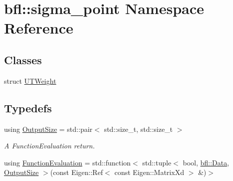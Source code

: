 \hypertarget{namespacebfl_1_1sigma__point}{}\section{bfl\+:\+:sigma\+\_\+point Namespace Reference}
\label{namespacebfl_1_1sigma__point}
\subsection*{Classes}
\begin{DoxyCompactItemize}
\item 
struct \mbox{\hyperlink{structbfl_1_1sigma__point_1_1UTWeight}{U\+T\+Weight}}
\end{DoxyCompactItemize}
\subsection*{Typedefs}
\begin{DoxyCompactItemize}
\item 
using \mbox{\hyperlink{namespacebfl_1_1sigma__point_aa482c1c98a2280cd8f7635ba81898b4e}{Output\+Size}} = std\+::pair$<$ std\+::size\+\_\+t, std\+::size\+\_\+t $>$
\begin{DoxyCompactList}\small\item\em A Function\+Evaluation return. \end{DoxyCompactList}\item 
using \mbox{\hyperlink{namespacebfl_1_1sigma__point_a6b412638c2556e4c1f84ba10965f785e}{Function\+Evaluation}} = std\+::function$<$ std\+::tuple$<$ bool, \mbox{\hyperlink{namespacebfl_af6b103c6821db1b54452f776fdd9dd02}{bfl\+::\+Data}}, \mbox{\hyperlink{namespacebfl_1_1sigma__point_aa482c1c98a2280cd8f7635ba81898b4e}{Output\+Size}} $>$(const Eigen\+::\+Ref$<$ const Eigen\+::\+Matrix\+Xd $>$ \&)$>$
\end{DoxyCompactItemize}
